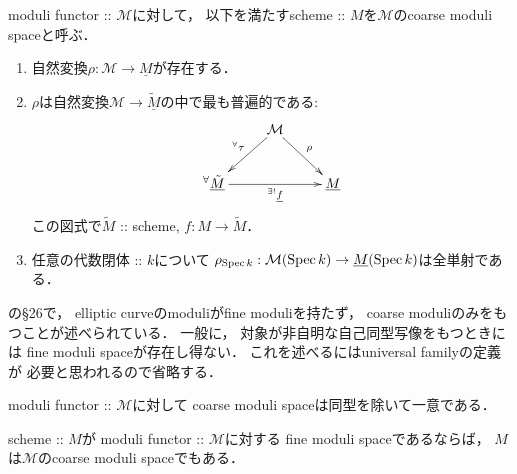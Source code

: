 \documentclass[a4paper]{jsarticle}
\newcommand{\func}[1]{\underline{#1}}
\newcommand{\ftorM}{\mathcal{M}}
\begin{document}
    \begin{Def}
        moduli functor :: $\ftorM$に対して，
        以下を満たすscheme :: $M$を$\ftorM$のcoarse moduli spaceと呼ぶ．
        \begin{enumerate}[label=(\roman*), leftmargin=*]
            \item
                自然変換$\rho: \ftorM \to \func{M}$が存在する．
            \item
                $\rho$は自然変換$\ftorM \to \func{\tilde{M}}$の中で最も普遍的である:
                \[
                \xymatrix
                {
                    {} & \ar[ld]_-{{}^{\forall} \tau}\ftorM \ar[rd]^-{\rho}& {} \\
                    {}^{\forall}\func{\tilde{M}} \ar[rr]_-{{}^{\exists!} \func{f}}& {} & \func{M}
                }
                \]
                この図式で$\tilde{M}$ :: scheme, $f: M \to \tilde{M}$．
            \item
                任意の代数閉体 :: $k$について
                $\rho_{\Spec k}: \ftorM(\Spec k) \to \func{M}(\Spec k)$は全単射である．
        \end{enumerate}
    \end{Def}

    \begin{Example}
        \cite{HarDef}の\S 26で，
        elliptic curveのmoduliがfine moduliを持たず，
        coarse moduliのみをもつことが述べられている．
        一般に，
        対象が非自明な自己同型写像をもつときには
        fine moduli spaceが存在し得ない．
        これを述べるにはuniversal familyの定義が
        必要と思われるので省略する．
    \end{Example}

    \begin{Prop}
        moduli functor :: $\ftorM$に対して
        coarse moduli spaceは同型を除いて一意である．
    \end{Prop}

    \begin{Prop}
        scheme :: $M$が
        moduli functor :: $\ftorM$に対する
        fine moduli spaceであるならば，
        $M$は$\ftorM$のcoarse moduli spaceでもある．
    \end{Prop}
\end{document}

